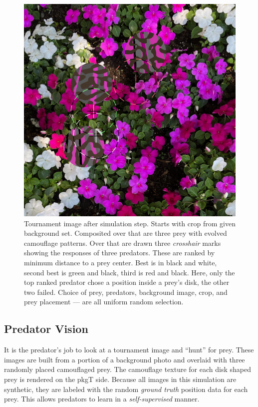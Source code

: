\documentclass[letterpaper]{article}
\newcommand{\jargon}[1]{\textit{#1}}
\newcommand{\texsyn}[0]{pkgT}
\begin{document}
\begin{figure}
    \centering
    \includegraphics[width=0.7\columnwidth]{20221007_0806_step_7030.png}
    \caption{Tournament image after simulation step. Starts with crop from given background set. Composited over that are three prey with evolved camouflage patterns. Over that are drawn three \jargon{crosshair} marks showing the responses of three predators. These are ranked by minimum distance to a prey center. Best is in black and white, second best is green and black, third is red and black. Here, only the top ranked predator chose a position inside a prey's disk, the other two failed. Choice of prey, predators, background image, crop, and prey placement — are all uniform random selection.}
    \label{fig:predator_responses}
\end{figure}



\subsection{Predator Vision}
It is the predator's job to look at a tournament image and “hunt” for prey. These images are built from a portion of a background photo and overlaid with three randomly placed camouflaged prey. The camouflage texture for each disk shaped prey is rendered on the \texsyn{} side. Because all images in this simulation are synthetic, they are labeled with the random \jargon{ground truth} position data for each prey. This allows predators to learn in a \jargon{self-supervised} manner.
\par
\end{document}
